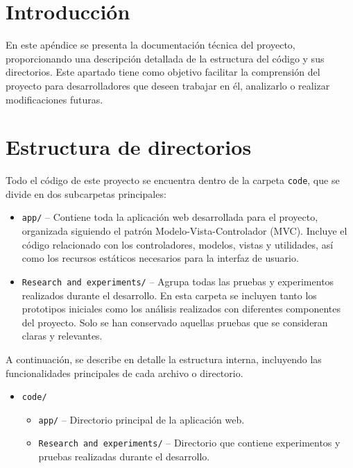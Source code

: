 
\section{Introducción}

En este apéndice se presenta la documentación técnica del proyecto, proporcionando una descripción detallada de la estructura del código y sus directorios. Este apartado tiene como objetivo facilitar la comprensión del proyecto para desarrolladores que deseen trabajar en él, analizarlo o realizar modificaciones futuras.

\section{Estructura de directorios}

Todo el código de este proyecto se encuentra dentro de la carpeta \texttt{code}, que se divide en dos subcarpetas principales:

\begin{itemize}
    \item \texttt{app/} -- Contiene toda la aplicación web desarrollada para el proyecto, organizada siguiendo el patrón Modelo-Vista-Controlador (MVC). Incluye el código relacionado con los controladores, modelos, vistas y utilidades, así como los recursos estáticos necesarios para la interfaz de usuario.
    \item \texttt{Research and experiments/} -- Agrupa todas las pruebas y experimentos realizados durante el desarrollo. En esta carpeta se incluyen tanto los prototipos iniciales como los análisis realizados con diferentes componentes del proyecto. Solo se han conservado aquellas pruebas que se consideran claras y relevantes.
\end{itemize}

A continuación, se describe en detalle la estructura interna, incluyendo las funcionalidades principales de cada archivo o directorio.
            

\begin{itemize}
    \item \texttt{code/}
    \begin{itemize}
        \item \texttt{app/} -- Directorio principal de la aplicación web.
        \item \texttt{Research and experiments/} -- Directorio que contiene experimentos y pruebas realizadas durante el desarrollo.
    \end{itemize}
\end{itemize}

